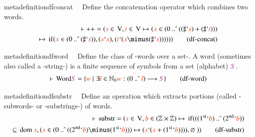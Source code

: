 \begin{restatable}{metadefinition}{dfconcat}~~ Define the concatenation operator
which combines two words. 
       ~
\begin{align}
\vdash \mathbin{\operatorname{++}} = ( \msc{s} \in \,\mathrm{V} , \msc{t} \in
    \,\mathrm{V} \mapsto ( \msc{x} \in ( 0 \mathbin{..\hat{\;}} ( ( \sharp `
    \msc{s} ) + ( \sharp ` \msc{t} ) ) ) \notag \\
     \mapsto \,\mathrm{if} ( \msc{x} \in (
    0 \mathbin{..\hat{\;}} ( \sharp ` \msc{s} ) ) , ( \msc{s} ` \msc{x} ) , (
    \msc{t} ` ( \msc{x} \minus ( \sharp ` \msc{s} ) ) ) ) )
    )\label{eq:df-concat}\tag{df-concat}
\end{align}
\end{restatable}

\begin{restatable}{metadefinition}{dfword}~~ Define the class of -words over a set-. 
A word (sometimes also called a
       -string-) is a finite sequence of symbols from a set (alphabet)
$\mc{S}$.  ~
\begin{align}
\vdash \,\mathrm{Word} \mc{S} = \{ \msc{w}~\vert~\exists \msc{l} \in \mathbb{N}_0
    \msc{w} : ( 0 \mathbin{..\hat{\;}} \msc{l} ) \longrightarrow \mc{S}
    \}\label{eq:df-word}\tag{df-word}
\end{align}
\end{restatable}

\begin{restatable}{metadefinition}{dfsubstr}~~ Define an operation which extracts
portions (called -subwords- or
       -substrings-) of words.   ~
\begin{align}
\vdash \,\mathrm{substr} = ( \msc{s} \in \,\mathrm{V} , \msc{b} \in (
    \mathbb{Z} \times \mathbb{Z} ) \mapsto \,\mathrm{if} ( ( ( 1^\mathrm{st} `
    \msc{b} ) \mathbin{..\hat{\;}} ( 2^\mathrm{nd} ` \msc{b} ) ) \notag \\
     \subseteq
    \,\mathrm{dom}~ \msc{s} , ( \msc{x} \in ( 0 \mathbin{..\hat{\;}} ( (
    2^\mathrm{nd} ` \msc{b} ) \minus ( 1^\mathrm{st} ` \msc{b} ) ) ) \mapsto (
    \msc{s} ` ( \msc{x} + ( 1^\mathrm{st} ` \msc{b} ) ) ) ) , \varnothing~ )
    )\label{eq:df-substr}\tag{df-substr}
\end{align}
\end{restatable}

